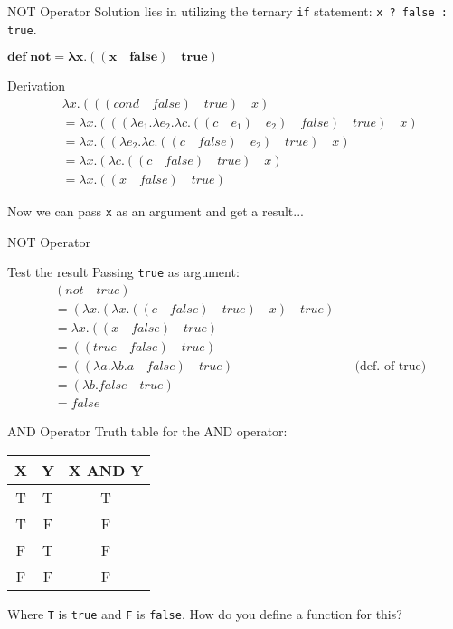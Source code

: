\documentclass{beamer}
\begin{document}
\begin{frame}{NOT Operator}
Solution lies in utilizing the ternary \texttt{if} statement: \texttt{x ? false : true}.
\begin{framed} $\mathbf{def \; not = \lambda x . ((x \quad false) \quad true)}$ \end{framed}
\begin{block}{Derivation}
\begin{align*}
	&\lambda x . (((cond \quad false) \quad true) \quad x) \\
    &= \lambda x.(((\lambda e_1. \lambda e_2 . \lambda c . ((c \quad e_1) \quad e_2) \quad false) \quad true) \quad x) \\
    &= \lambda x.((\lambda e_2 . \lambda c . ((c \quad false) \quad e_2) \quad true) \quad x) \\
    &= \lambda x.(\lambda c . ((c \quad false) \quad true) \quad x) \\
    &= \lambda x.((x \quad false) \quad true)
\end{align*}
\end{block}
Now we can pass \texttt{x} as an argument and get a result...
\end{frame}

\begin{frame}{NOT Operator}
\begin{block}{Test the result}
Passing \texttt{true} as argument:
\begin{align*}
	&(not \quad true) \\
    &= (\lambda x.(\lambda x. ((c \quad false) \quad true) \quad x) \quad true) &&\\
    &= \lambda x.((x \quad false) \quad true) &&\\
    &= ((true \quad false) \quad true) &&\\
    &= ((\lambda a . \lambda b . a \quad false) \quad true) &&\text{(def. of true)}\\
    &= (\lambda b . false \quad true) &&\\
    &= false &&
\end{align*}
\end{block}
\end{frame}

\begin{frame}{AND Operator}
Truth table for the AND operator:
\begin{table}
\centering
\begin{tabular}{c|c|c}
X & Y & X AND Y \\\hline
T & T & T \\
T & F & F \\
F & T & F \\
F & F & F
\end{tabular}
\end{table}
Where \texttt{T} is \texttt{true} and \texttt{F} is \texttt{false}. How do you define a function for this?
\end{frame}
\end{document}
